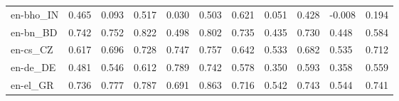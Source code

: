 \begin{tabular}{lllllllllll}
en-bho\_IN & \cellcolor[HTML]{E0F295}\textcolor[HTML]{000000}{0.465} & \cellcolor[HTML]{F16640}\textcolor[HTML]{000000}{0.093} & \cellcolor[HTML]{C7E77F}\textcolor[HTML]{000000}{0.517} & \cellcolor[HTML]{DD3D2D}\textcolor[HTML]{FFFFFF}{0.030} & \cellcolor[HTML]{CFEB85}\textcolor[HTML]{000000}{0.503} & \cellcolor[HTML]{89CC67}\textcolor[HTML]{000000}{0.621} & \cellcolor[HTML]{E34933}\textcolor[HTML]{FFFFFF}{0.051} & \cellcolor[HTML]{EFF8AA}\textcolor[HTML]{000000}{0.428} & \cellcolor[HTML]{CC2627}\textcolor[HTML]{FFFFFF}{-0.008} & \cellcolor[HTML]{FCAA5F}\textcolor[HTML]{000000}{0.194} \\
en-bn\_BD & \cellcolor[HTML]{2DA155}\textcolor[HTML]{FFFFFF}{0.742} & \cellcolor[HTML]{279F53}\textcolor[HTML]{FFFFFF}{0.752} & \cellcolor[HTML]{0B7D42}\textcolor[HTML]{FFFFFF}{0.822} & \cellcolor[HTML]{D1EC86}\textcolor[HTML]{000000}{0.498} & \cellcolor[HTML]{108647}\textcolor[HTML]{FFFFFF}{0.802} & \cellcolor[HTML]{33A456}\textcolor[HTML]{FFFFFF}{0.735} & \cellcolor[HTML]{ECF7A6}\textcolor[HTML]{000000}{0.435} & \cellcolor[HTML]{36A657}\textcolor[HTML]{FFFFFF}{0.730} & \cellcolor[HTML]{E8F59F}\textcolor[HTML]{000000}{0.448} & \cellcolor[HTML]{A2D76A}\textcolor[HTML]{000000}{0.584} \\
en-cs\_CZ & \cellcolor[HTML]{8CCD67}\textcolor[HTML]{000000}{0.617} & \cellcolor[HTML]{54B45F}\textcolor[HTML]{000000}{0.696} & \cellcolor[HTML]{39A758}\textcolor[HTML]{FFFFFF}{0.728} & \cellcolor[HTML]{2AA054}\textcolor[HTML]{FFFFFF}{0.747} & \cellcolor[HTML]{219C52}\textcolor[HTML]{FFFFFF}{0.757} & \cellcolor[HTML]{7AC665}\textcolor[HTML]{000000}{0.642} & \cellcolor[HTML]{BFE47A}\textcolor[HTML]{000000}{0.533} & \cellcolor[HTML]{5DB961}\textcolor[HTML]{000000}{0.682} & \cellcolor[HTML]{BDE379}\textcolor[HTML]{000000}{0.535} & \cellcolor[HTML]{45AD5B}\textcolor[HTML]{000000}{0.712} \\
en-de\_DE & \cellcolor[HTML]{DAF08D}\textcolor[HTML]{000000}{0.481} & \cellcolor[HTML]{B7E075}\textcolor[HTML]{000000}{0.546} & \cellcolor[HTML]{8ECF67}\textcolor[HTML]{000000}{0.612} & \cellcolor[HTML]{138C4A}\textcolor[HTML]{FFFFFF}{0.789} & \cellcolor[HTML]{2DA155}\textcolor[HTML]{FFFFFF}{0.742} & \cellcolor[HTML]{A5D86A}\textcolor[HTML]{000000}{0.578} & \cellcolor[HTML]{FFF2AA}\textcolor[HTML]{000000}{0.350} & \cellcolor[HTML]{9BD469}\textcolor[HTML]{000000}{0.593} & \cellcolor[HTML]{FFF5AE}\textcolor[HTML]{000000}{0.358} & \cellcolor[HTML]{B1DE71}\textcolor[HTML]{000000}{0.559} \\
en-el\_GR & \cellcolor[HTML]{33A456}\textcolor[HTML]{FFFFFF}{0.736} & \cellcolor[HTML]{17934E}\textcolor[HTML]{FFFFFF}{0.777} & \cellcolor[HTML]{148E4B}\textcolor[HTML]{FFFFFF}{0.787} & \cellcolor[HTML]{57B65F}\textcolor[HTML]{000000}{0.691} & \cellcolor[HTML]{006837}\textcolor[HTML]{FFFFFF}{0.863} & \cellcolor[HTML]{42AC5A}\textcolor[HTML]{000000}{0.716} & \cellcolor[HTML]{B9E176}\textcolor[HTML]{000000}{0.542} & \cellcolor[HTML]{2DA155}\textcolor[HTML]{FFFFFF}{0.743} & \cellcolor[HTML]{B9E176}\textcolor[HTML]{000000}{0.544} & \cellcolor[HTML]{30A356}\textcolor[HTML]{FFFFFF}{0.741} \\

\end{tabular}
